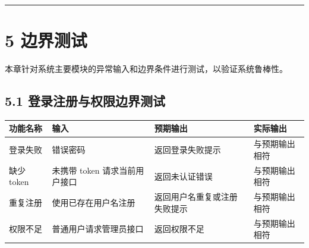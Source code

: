 \begin{center}\rule{0.5\linewidth}{0.5pt}\end{center}

\section{5 边界测试}\label{ux8fb9ux754cux6d4bux8bd5}

本章针对系统主要模块的异常输入和边界条件进行测试，以验证系统鲁棒性。

\subsection{5.1
登录注册与权限边界测试}\label{ux767bux5f55ux6ce8ux518cux4e0eux6743ux9650ux8fb9ux754cux6d4bux8bd5}

{\def\LTcaptype{none} %
\begin{longtable}[]{@{}|
  >{\raggedright\arraybackslash}p{}|
  >{\raggedright\arraybackslash}p{}|
  >{\raggedright\arraybackslash}p{}|
  >{\raggedright\arraybackslash}p{}|@{}}
\hline
\rowcolor{gray!12}
\begin{minipage}[b]{\linewidth}\raggedright
\bfseries 功能名称
\end{minipage} & \begin{minipage}[b]{\linewidth}\raggedright
\bfseries 输入
\end{minipage} & \begin{minipage}[b]{\linewidth}\raggedright
\bfseries 预期输出
\end{minipage} & \begin{minipage}[b]{\linewidth}\raggedright
\bfseries 实际输出
\end{minipage} \\
\hline
\endhead
\hline
\endlastfoot
登录失败 & 错误密码 & 返回登录失败提示 & 与预期输出相符 \\
\hline
缺少 token & 未携带 token 请求当前用户接口 & 返回未认证错误 &
与预期输出相符 \\
\hline
重复注册 & 使用已存在用户名注册 & 返回用户名重复或注册失败提示 &
与预期输出相符 \\
\hline
权限不足 & 普通用户请求管理员接口 & 返回权限不足 & 与预期输出相符 \\
\hline
\end{longtable}
}

